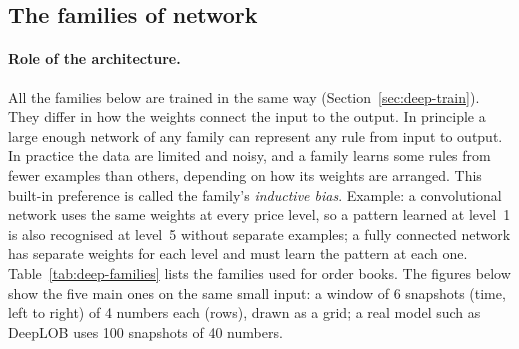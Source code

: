 \subsection{The families of network}
\label{sec:deep-families}

\paragraph{Role of the architecture.} All the families below are trained in the same way (Section~\ref{sec:deep-train}).
They differ in how the weights connect the input to the output. In principle a large enough network of any family
can represent any rule from input to output. In practice the data are limited and noisy, and a family learns some
rules from fewer examples than others, depending on how its weights are arranged. This built-in preference is
called the family's \emph{inductive bias}. Example: a convolutional network uses the same weights at every price
level, so a pattern learned at level~1 is also recognised at level~5 without separate examples; a fully connected
network has separate weights for each level and must learn the pattern at each one.
Table~\ref{tab:deep-families} lists the families used for order books. The figures below show the five main ones on
the same small input: a window of 6 snapshots (time, left to right) of 4 numbers each (rows), drawn as a grid; a real
model such as DeepLOB uses 100 snapshots of 40 numbers.

